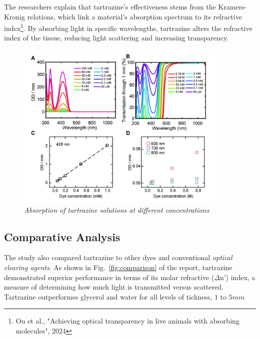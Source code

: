 \documentclass[12pt]{article}
\begin{document}
The researchers explain that tartrazine's effectiveness stems from the Kramers-Kronig relations, which link a material's absorption spectrum to its refractive index\footnote{Ou et al., "Achieving optical transparency in live animals with absorbing molecules", 2024}. By absorbing light in specific wavelengths, tartrazine alters the refractive index of the tissue, reducing light scattering and increasing transparency.


\begin{figure}[H]
  \centering
  \includegraphics[width=0.9\textwidth]{figures/Tartrazine Light Absorption.png}
  \caption{\emph{Absorption of tartrazine solutions at different concentrations}}
  \label{fig:absorption}
\end{figure}




\subsection{Comparative Analysis}
The study also compared tartrazine to other dyes and conventional \emph{optical clearing agents}. As shown in Fig.~\ref{fig:comparison} of the report, 
tartrazine demonstrated superior performance in terms of its molar refractive ($\Delta$n') index, a measure of determining how much light is transmitted versus scattered.
Tartrazine outperformes glycerol and water for all levels of tickness, $1$ to $5 mm$
\end{document}
